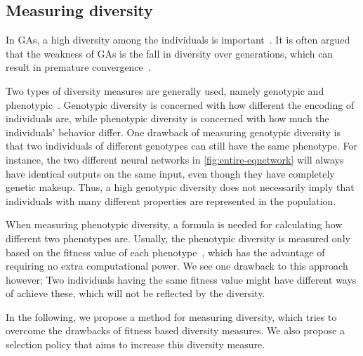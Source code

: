 \subsection{Measuring diversity}
In GAs, a high diversity among the individuals is important~\cite{1266373,Zitzler00comparisonof}. It is often argued that the weakness of GAs is the fall in diversity over generations, which can result in premature convergence~\cite{diaz2007empirical}.

Two types of diversity measures are generally used, namely genotypic and phenotypic~\cite{Nguyen:2006:ASPGP,1250187}. Genotypic diversity is concerned with how different the encoding of individuals are, while phenotypic diversity is concerned with how much the individuals' behavior differ. One drawback of measuring genotypic diversity is that two individuals of different genotypes can still have the same phenotype. For instance, the two different neural networks in \cref{fig:entire-eqnetwork} will always have identical outputs on the same input, even though they have completely genetic makeup. Thus, a high genotypic diversity does not necessarily imply that individuals with many different properties are represented in the population.
%

%
When measuring phenotypic diversity, a formula is needed for calculating how different two phenotypes are. Usually, the phenotypic diversity is measured only based on the fitness value of each phenotype~\cite{Nguyen:2006:ASPGP}, which has the advantage of requiring no extra computational power. We see one drawback to this approach however; Two individuals having the same fitness value might have different ways of achieve these, which will not be reflected by the diversity. 

In the following, we propose a method for measuring diversity, which tries to overcome the drawbacks of fitness based diversity measures. We also propose a selection policy that aims to increase this diversity measure.
